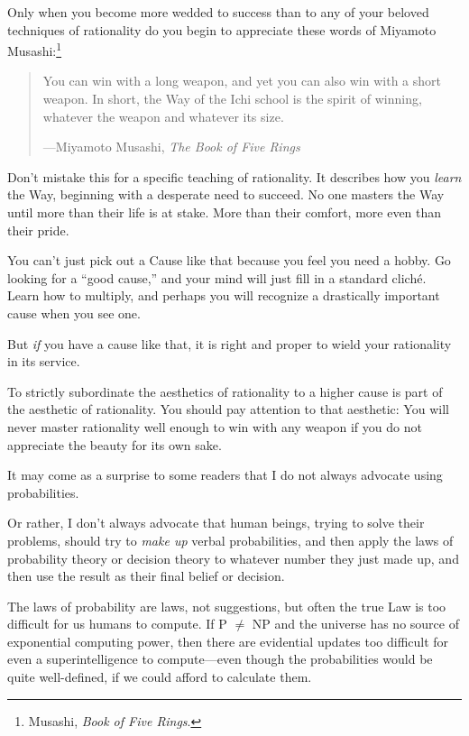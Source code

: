 {
 Only when you become more wedded to success than to any of your
beloved techniques of rationality do you begin to appreciate these
words of Miyamoto Musashi:\footnote{Musashi, \textit{Book of Five Rings}.}}

\begin{quote}
{
 You can win with a long weapon, and yet you can also win with a
short weapon. In short, the Way of the Ichi school is the spirit of
winning, whatever the weapon and whatever its size.}

{\raggedleft
 {}---Miyamoto Musashi, \textit{The Book of Five Rings}
 \par}
\end{quote}


{
 Don't mistake this for a specific teaching of
rationality. It describes how you \textit{learn} the Way, beginning
with a desperate need to succeed. No one masters the Way until more
than their life is at stake. More than their comfort, more even than
their pride.}

{
 You can't just pick out a Cause like that because
you feel you need a hobby. Go looking for a ``good
cause,'' and your mind will just fill in a standard
cliché. Learn how to multiply, and perhaps you will recognize a
drastically important cause when you see one.}

{
 But \textit{if} you have a cause like that, it is right and proper
to wield your rationality in its service.}

{
 To strictly subordinate the aesthetics of rationality to a higher
cause is part of the aesthetic of rationality. You should pay attention
to that aesthetic: You will never master rationality well enough to win
with any weapon if you do not appreciate the beauty for its own sake.}

\myendsectiontext


\bigskip


{
 It may come as a surprise to some readers that I do not always
advocate using probabilities. }

{
 Or rather, I don't always advocate that human
beings, trying to solve their problems, should try to \textit{make up}
verbal probabilities, and then apply the laws of probability theory or
decision theory to whatever number they just made up, and then use the
result as their final belief or decision.}

{
 The laws of probability are laws, not suggestions, but often the
true Law is too difficult for us humans to compute. If P ${\neq}$ NP
and the universe has no source of exponential computing power, then
there are evidential updates too difficult for even a superintelligence
to compute---even though the probabilities would be quite well-defined,
if we could afford to calculate them.}

